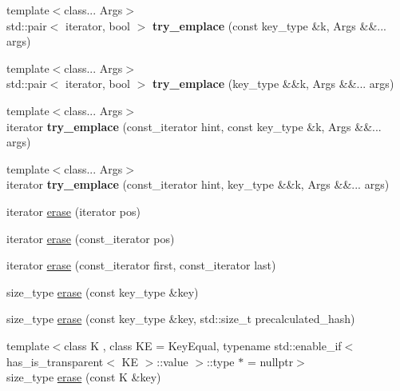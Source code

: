 \begin{DoxyCompactItemize}
\item 
\mbox{\label{classtsl_1_1ordered__map_a8b418ae075582f9008508b13f5870de2}} 
{\footnotesize template$<$class... Args$>$ }\\std\+::pair$<$ iterator, bool $>$ {\bfseries try\+\_\+emplace} (const key\+\_\+type \&k, Args \&\&... args)
\item 
\mbox{\label{classtsl_1_1ordered__map_a847454d4a4ed684da4a7578335d2f4b1}} 
{\footnotesize template$<$class... Args$>$ }\\std\+::pair$<$ iterator, bool $>$ {\bfseries try\+\_\+emplace} (key\+\_\+type \&\&k, Args \&\&... args)
\item 
\mbox{\label{classtsl_1_1ordered__map_a6aabcb4a022aba655f9565dce3ca4019}} 
{\footnotesize template$<$class... Args$>$ }\\iterator {\bfseries try\+\_\+emplace} (const\+\_\+iterator hint, const key\+\_\+type \&k, Args \&\&... args)
\item 
\mbox{\label{classtsl_1_1ordered__map_abca491f89bceca755a5acd027ee2d272}} 
{\footnotesize template$<$class... Args$>$ }\\iterator {\bfseries try\+\_\+emplace} (const\+\_\+iterator hint, key\+\_\+type \&\&k, Args \&\&... args)
\item 
iterator \mbox{\hyperlink{classtsl_1_1ordered__map_aaf51b608561995a094a8b6ae4c5e5086}{erase}} (iterator pos)
\item 
iterator \mbox{\hyperlink{classtsl_1_1ordered__map_ac680d06a37e264ed8ee8ff656ff2d373}{erase}} (const\+\_\+iterator pos)
\item 
iterator \mbox{\hyperlink{classtsl_1_1ordered__map_ae9a48c374849dba7c402f33b39c538b6}{erase}} (const\+\_\+iterator first, const\+\_\+iterator last)
\item 
size\+\_\+type \mbox{\hyperlink{classtsl_1_1ordered__map_a6bf7811b4bfc892388dfc2b5b0c0c8b9}{erase}} (const key\+\_\+type \&key)
\item 
size\+\_\+type \mbox{\hyperlink{classtsl_1_1ordered__map_af18a8b5ef294c869de50d133c2086072}{erase}} (const key\+\_\+type \&key, std\+::size\+\_\+t precalculated\+\_\+hash)
\item 
{\footnotesize template$<$class K , class KE  = Key\+Equal, typename std\+::enable\+\_\+if$<$ has\+\_\+is\+\_\+transparent$<$ K\+E $>$\+::value $>$\+::type $\ast$  = nullptr$>$ }\\size\+\_\+type \mbox{\hyperlink{classtsl_1_1ordered__map_aad75297e1383569fbf7b6288ed9ebe4d}{erase}} (const K \&key)

\end{DoxyCompactItemize}
